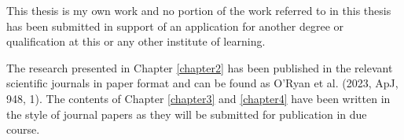 


\begin{declaration}        %

This thesis is my own work and no portion of the work referred to in this thesis has been submitted in support of an application for another degree or qualification at this or any other institute of learning.

The research presented in Chapter \ref{chapter2} has been published in the relevant scientific journals in paper format and can be found as O'Ryan et al. (2023, ApJ, 948, 1). The contents of Chapter \ref{chapter3} and \ref{chapter4} have been written in the style of journal papers as they will be submitted for publication in due course.

\end{declaration}



